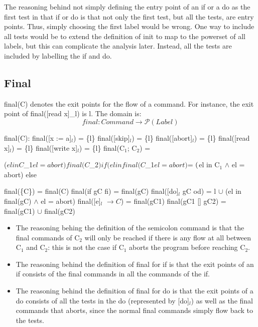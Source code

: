 The reasoning behind not simply defining the entry point of an if or a do as the first
test in that if or do is that not only the first test, but all the tests, are entry points.
Thus, simply choosing the first label would be wrong. One way to include all tests would
be to extend the definition of init to map to the powerset of all labels, but this
can complicate the analysis later. Instead, all the tests are included by labelling
the if and do.



\subsection{Final}

final(C) denotes the exit points for the flow of a command.
For instance, the exit point of final([read x]\_l) is l. The domain is:
\[final \colon Command \to \mathcal{P}(Label)\]

final(C):\newline
final([x := a]$_l$)      = \{l\}\newline
final([skip]$_l$)        = \{l\}\newline
final([abort]$_l$)       = \{l\}\newline
final([read x]$_l$)      = \{l\}\newline
final([write x]$_l$)   	 = \{l\}\newline
final(C$_1$; C$_2$)		 = \begin{cases}
($el in C$_1$ $\wedge$ el = abort) $\cup$ final(C$_2$) if (el in final(C$_1$ $\wedge$ el $\not$ = abort) $\not = \emptyset$ \\
($el in C$_1$ $\wedge$ el = abort) else
\end{cases}\newline
final(\{C\})             = final(C)\newline
final(if gC fi)        = final(gC)\newline
final([do]$_l$ gC od)        = {l} $\cup$ (el in final(gC) $\wedge$ el = abort)\newline
final([e]$_l$ $\to C$)      = final(gC1)\newline
final(gC1 [] gC2)      = final(gC1) $\cup$ final(gC2)\newline

\begin{itemize}
\item The reasoning behing the definition of the semicolon command is that the
final commands of C$_2$ will only be reached if there is any flow at all
between C$_1$ and C$_2$: this is not the case if C$_1$ aborts the program
before reaching C$_2$.
\item The reasoning behind the definition of final for if is that the exit points
of an if consists of the final commands in all the commands of the if.
\item The reasoning behind the definition of final for do is that the exit points
of a do consists of all the tests in the do (represented by [do]$_l$)
as well as the final commands that aborts, since the normal final commands
simply flow back to the tests.
\end{itemize}



